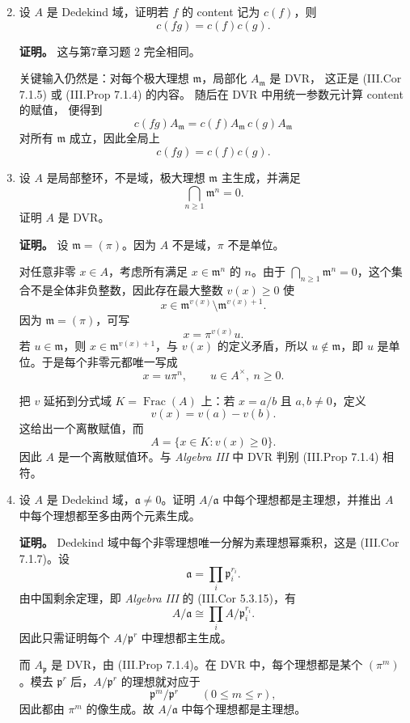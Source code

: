 \documentclass[a4paper]{ctexart}
\begin{document}
\begin{enumerate}[leftmargin=*, label=\textbf{9.\arabic*.}]
\setcounter{enumi}{1}
\item 设 \(A\) 是 Dedekind 域，证明若 \(f\) 的 content 记为 \(c(f)\)，则
\[
c(fg)=c(f)c(g).
\]

\textbf{证明。}
这与第7章习题 2 完全相同。

关键输入仍然是：对每个极大理想 \(\mathfrak m\)，局部化 \(A_{\mathfrak m}\) 是 DVR，
这正是 (III.Cor 7.1.5) 或 (III.Prop 7.1.4) 的内容。
随后在 DVR 中用统一参数元计算 content 的赋值，
便得到
\[
c(fg)A_{\mathfrak m}=c(f)A_{\mathfrak m}\,c(g)A_{\mathfrak m}
\]
对所有 \(\mathfrak m\) 成立，因此全局上
\[
c(fg)=c(f)c(g).
\]

\setcounter{enumi}{3}
\item 设 \(A\) 是局部整环，不是域，极大理想 \(\mathfrak m\) 主生成，并满足
\[
\bigcap_{n\ge 1}\mathfrak m^n=0.
\]
证明 \(A\) 是 DVR。

\textbf{证明。}
设 \(\mathfrak m=(\pi)\)。因为 \(A\) 不是域，\(\pi\) 不是单位。

对任意非零 \(x\in A\)，考虑所有满足 \(x\in \mathfrak m^n\) 的 \(n\)。由于 \(\bigcap_{n\ge 1}\mathfrak m^n=0\)，这个集合不是全体非负整数，因此存在最大整数 \(v(x)\ge 0\) 使
\[
x\in \mathfrak m^{v(x)}\setminus \mathfrak m^{v(x)+1}.
\]
因为 \(\mathfrak m=(\pi)\)，可写
\[
x=\pi^{v(x)}u.
\]
若 \(u\in \mathfrak m\)，则 \(x\in \mathfrak m^{v(x)+1}\)，与 \(v(x)\) 的定义矛盾，所以 \(u\notin \mathfrak m\)，即 \(u\) 是单位。于是每个非零元都唯一写成
\[
x=u\pi^n,\qquad u\in A^\times,\ n\ge 0.
\]

把 \(v\) 延拓到分式域 \(K=\operatorname{Frac}(A)\) 上：若 \(x=a/b\) 且 \(a,b\neq 0\)，定义
\[
v(x)=v(a)-v(b).
\]
这给出一个离散赋值，而
\[
A=\{x\in K:v(x)\ge 0\}.
\]
因此 \(A\) 是一个离散赋值环。与 \textit{Algebra III} 中 DVR 判别 (III.Prop 7.1.4) 相符。

\setcounter{enumi}{6}
\item 设 \(A\) 是 Dedekind 域，\(\mathfrak a\neq 0\)。证明 \(A/\mathfrak a\) 中每个理想都是主理想，并推出 \(A\) 中每个理想都至多由两个元素生成。

\textbf{证明。}
Dedekind 域中每个非零理想唯一分解为素理想幂乘积，这是 (III.Cor 7.1.7)。设
\[
\mathfrak a=\prod_i \mathfrak p_i^{r_i}.
\]
由中国剩余定理，即 \textit{Algebra III} 的 (III.Cor 5.3.15)，有
\[
A/\mathfrak a \cong \prod_i A/\mathfrak p_i^{r_i}.
\]
因此只需证明每个 \(A/\mathfrak p^r\) 中理想都主生成。

而 \(A_{\mathfrak p}\) 是 DVR，由 (III.Prop 7.1.4)。在 DVR 中，每个理想都是某个 \((\pi^m)\)。模去 \(\mathfrak p^r\) 后，\(A/\mathfrak p^r\) 的理想就对应于
\[
\mathfrak p^m/\mathfrak p^r\qquad (0\le m\le r),
\]
因此都由 \(\pi^m\) 的像生成。故 \(A/\mathfrak a\) 中每个理想都是主理想。


\end{enumerate}
\end{document}
